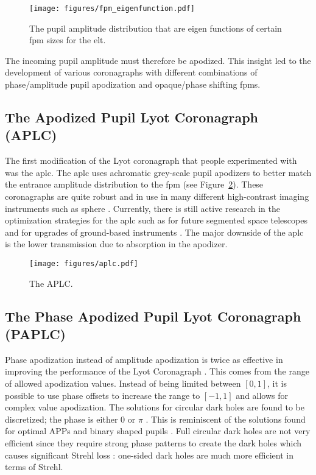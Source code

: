 \documentclass[letterpaper]{ar-1col}
\begin{document}
\begin{figure}[ht]
  \centering
  \texttt{[image: figures/fpm\_eigenfunction.pdf]}
  \caption{The pupil amplitude distribution that are eigen functions of certain \ac{fpm} sizes for the \ac{elt}.}
  \label{fig:fpm_eigenfunctions}
\end{figure}

The incoming pupil amplitude must therefore be apodized. This insight led to the development of various coronagraphs with different combinations of phase/amplitude pupil apodization and opaque/phase shifting \acp{fpm}.

\subsection{The Apodized Pupil Lyot Coronagraph (APLC)}

The first modification of the Lyot coronagraph that people experimented with was the \ac{aplc}.
%
The \ac{aplc} uses achromatic grey-scale pupil apodizers to better match the entrance amplitude distribution to the \ac{fpm} (see Figure~\ref{fig:coro_aplc}).
%
These coronagraphs are quite robust and in use in many different high-contrast imaging instruments such as \ac{sphere} \citep{beuzit2019sphere}.
%
Currently, there is still active research in the optimization strategies for the \ac{aplc} such as for future segmented space telescopes \citep{zimmerman2016lyot} and for upgrades of ground-based instruments \citep{nickson2022aplc}.
%
The major downside of the \ac{aplc} is the lower transmission due to absorption in the apodizer.

\begin{figure}[ht]
  \centering
  \texttt{[image: figures/aplc.pdf]}
  \caption{The APLC.}
  \label{fig:coro_aplc}
\end{figure}


\subsection{The Phase Apodized Pupil Lyot Coronagraph (PAPLC)}
\label{sec:paplc}
Phase apodization instead of amplitude apodization is twice as effective in improving the performance of the Lyot Coronagraph \citep{Por20}.
%
This comes from the range of allowed apodization values.
%
Instead of being limited between $[0, 1]$, it is possible to use phase offsets to increase the range to $[-1, 1]$ and allows for complex value apodization.
%
The solutions for circular dark holes are found to be discretized; the phase is either 0 or $\pi$ \citep{Por20}.
%
This is reminiscent of the solutions found for optimal APPs \citep{Por17} and binary shaped pupils \citep{Carlotti11}.
%
Full circular dark holes are not very efficient since they require strong phase patterns to create the dark holes which causes significant Strehl loss \citep{Por17}: one-sided dark holes are much more efficient in terms of Strehl. 
\end{document}
